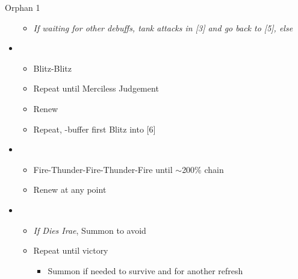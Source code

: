 \begin{battle}{Orphan 1}
\begin{itemize}
\begin{itemize}
				\item \textit{If waiting for other debuffs, tank attacks in [3] and go back to [5], else}
			\end{itemize}
		\item \second
			\begin{itemize}
				\item Blitz-Blitz
				\item Repeat until Merciless Judgement
				\item Renew
				\item Repeat, \rav-buffer first Blitz into [6]
			\end{itemize}
		\item \sixth
			\begin{itemize}
				\item Fire-Thunder-Fire-Thunder-Fire until $\sim$200\% chain
				\item Renew at any point
			\end{itemize}
		\item \second
			\begin{itemize}
				\item \textit{If Dies Irae}, Summon to avoid
				\item Repeat until victory
					\begin{itemize}
						\item Summon if needed to survive and for another refresh
					\end{itemize}
			\end{itemize}
	\end{itemize}
\end{battle}

